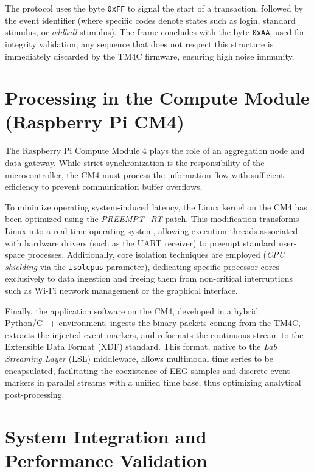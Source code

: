The protocol uses the byte \texttt{0xFF} to signal the start of a transaction, followed by the event identifier (where specific codes denote states such as login, standard stimulus, or \textit{oddball} stimulus). The frame concludes with the byte \texttt{0xAA}, used for integrity validation; any sequence that does not respect this structure is immediately discarded by the TM4C firmware, ensuring high noise immunity.

\section{Processing in the Compute Module (Raspberry Pi CM4)}
\label{sec:rpi_software}

The Raspberry Pi Compute Module 4 plays the role of an aggregation node and data gateway. While strict synchronization is the responsibility of the microcontroller, the CM4 must process the information flow with sufficient efficiency to prevent communication buffer overflows.

To minimize operating system-induced latency, the Linux kernel on the CM4 has been optimized using the \textit{PREEMPT\_RT} patch. This modification transforms Linux into a real-time operating system, allowing execution threads associated with hardware drivers (such as the UART receiver) to preempt standard user-space processes. Additionally, core isolation techniques are employed (\textit{CPU shielding} via the \texttt{isolcpus} parameter), dedicating specific processor cores exclusively to data ingestion and freeing them from non-critical interruptions such as Wi-Fi network management or the graphical interface.

Finally, the application software on the CM4, developed in a hybrid Python/C++ environment, ingests the binary packets coming from the TM4C, extracts the injected event markers, and reformats the continuous stream to the Extensible Data Format (XDF) standard. This format, native to the \textit{Lab Streaming Layer} (LSL) middleware, allows multimodal time series to be encapsulated, facilitating the coexistence of EEG samples and discrete event markers in parallel streams with a unified time base, thus optimizing analytical post-processing.

\section{System Integration and Performance Validation}
\label{sec:system_validation}

